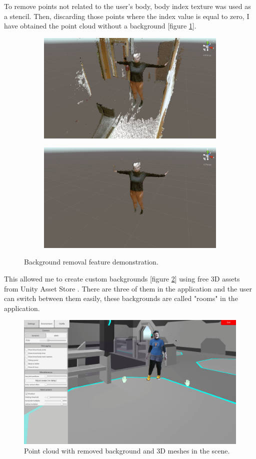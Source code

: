 \documentclass[a4paper]{report}
\begin{document}
To remove points not related to the user's body, body index texture was used as a stencil. Then, discarding those points where the index value is equal to zero, I have obtained the point cloud without a background [figure \ref{fig:pc_demo_4}].



\begin{figure}[H]
\centering
\begin{subfigure}{\textwidth}
  \centering
  \includegraphics[width=.45\textwidth , keepaspectratio]{images/pointCloud/Screenshot 2021-05-13 174257.png}
\end{subfigure}%
\begin{subfigure}{\textwidth}
  \centering
 \includegraphics[width=.45\textwidth , keepaspectratio]{images/pointCloud/Screenshot 2021-05-13 174343.png}
\end{subfigure}
\caption{Background removal feature demonstration.}
\label{fig:pc_demo_4}
\end{figure}


This allowed me to create custom backgrounds [figure \ref{fig:backgroungdemo}] using free 3D assets from Unity Asset Store \cite{assetUnity_1}\cite{assetUnity_2}. There are three of them in the application and the user can switch between them easily, these backgrounds are called "rooms" in the application.


\begin{figure}[H]
\centering
\includegraphics[width=\textwidth , keepaspectratio]{images/OffAxis/off_axis_1.png}
\caption{Point cloud with removed background and 3D meshes in the scene.}
\label{fig:backgroungdemo}
\end{figure}
\end{document}
